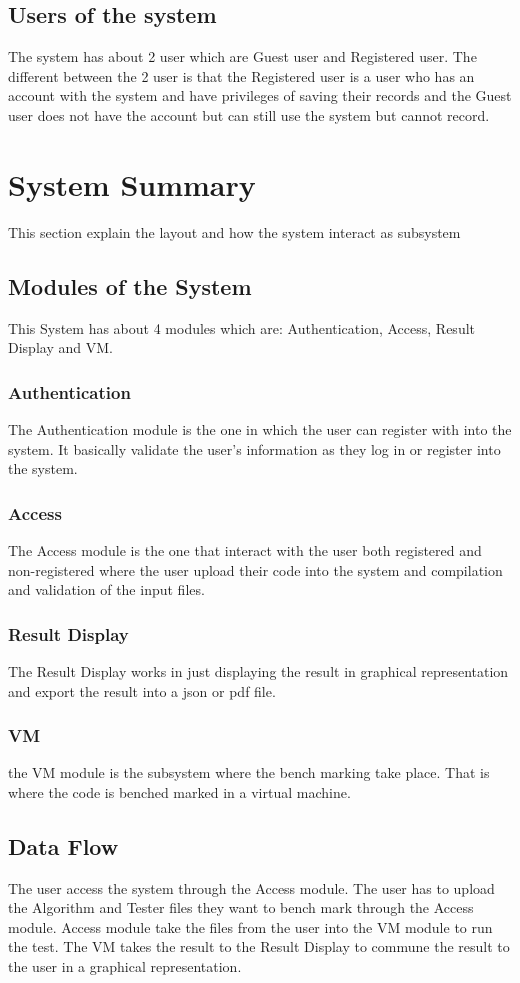 \documentclass[runningheads,a4paper]{article}
\begin{document}
\subsection{Users of the system}
The system has about 2 user which are Guest user and Registered user. The different between the 2 user is that the Registered user is a user who has an account with the system and have privileges of saving their records and the Guest user does not have the account but can still use the system but cannot record. 

\section{System Summary}
This section explain the layout and how the system interact as subsystem
\subsection{Modules of the System}
This System has about 4 modules which are: Authentication, Access, Result Display and VM.\newline
 \subsubsection{Authentication}
The Authentication module is the one in which the user can register with into the system. It basically validate the user's information as they log in or register into the system.
\subsubsection{Access}
The Access module is the one that interact with the user both registered and non-registered where the user upload their code into the system and compilation and validation of the input files.
\subsubsection{Result Display}
The Result Display works in just displaying the result in graphical representation and export the result into a json or pdf file.
\subsubsection{VM}
the VM module is the subsystem where the bench marking take place. That is where the code is benched marked in a virtual machine.

\subsection{Data Flow}
The user access the system through the Access module. The user has to upload the Algorithm and Tester files they want to bench mark through the Access module. Access module take the files from the user into the VM module to run the test. The VM takes the result to the Result Display to commune the result to the user in a graphical representation.
\end{document}
